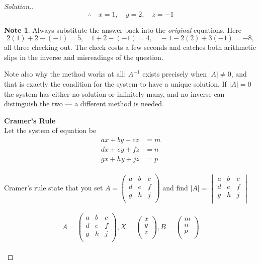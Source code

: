 \documentclass[11pt,a4paper]{article}
\theoremstyle{definition}
\newtheorem{note}[thm]{Note}
\newenvironment{solution}
  {\renewcommand{\qedsymbol}{}\begin{proof}[\textit{Solution}.]}
  {\end{proof}}
\begin{document}
\begin{enumerate}
\begin{solution}
$$\therefore \quad  x=1,\quad  y=2,\quad  z=-1$$

\begin{note}
Always substitute the answer back into the \emph{original} equations. Here
$$2(1)+2-(-1)=5,\quad 1+2-(-1)=4,\quad -1-2(2)+3(-1)=-8,$$
all three checking out. The check costs a few seconds and catches both arithmetic
slips in the inverse and misreadings of the question.

Note also why the method works at all: $A^{-1}$ exists precisely when
$\left|A\right|\neq 0$, and that is exactly the condition for the system to have a
unique solution. If $\left|A\right|=0$ the system has either no solution or
infinitely many, and no inverse can distinguish the two --- a different method is
needed.
\end{note}





\item[(b).]\textbf{Cramer's Rule}\\
Let the system of equation be
\begin{align*}
ax+by+cz &=m\\
dx+ey+fz &=n\\
gx+hy+jz &=p\\
\end{align*}

Cramer's rule state that you set $A=
\begin{pmatrix}
a & b & c\\
d & e & f\\
g & h & j\\
\end{pmatrix}
$ and find $|A|=
\begin{vmatrix}
a & b & c\\
d & e & f\\
g & h & j\\
\end{vmatrix}
$\\\\

$$A=
\begin{pmatrix}
a & b & c\\
d & e & f\\
g & h & j\\
\end{pmatrix}
, X=
\begin{pmatrix}
x\\y\\z\\
\end{pmatrix}
, B=
\begin{pmatrix}
m\\ n\\ p\\
\end{pmatrix}
$$\\


\end{solution}
\end{enumerate}
\end{document}
